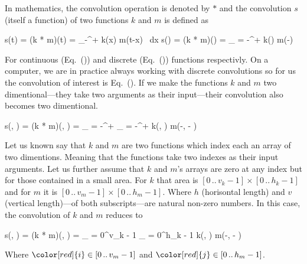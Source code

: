 \startsubsubsection[title=Where is the convolution?]
In mathematics, the convolution operation is denoted by $*$ and the convolution $s$ (itself a function) of two functions $k$ and $m$ is defined as

\startplaceformula[reference=cont-conv]
\startformula
s(t) = (k * m)(t) = \int_{{-}\infty}^{{+}\infty} k(x) \cdot m(t-x) \, {\rm d}x
\stopformula
\stopplaceformula
\startplaceformula[reference=disc-conv]
\startformula
s(\color[red]{i}) = (k * m)(\color[red]{i}) = \sum_{\color[blue]{i} = {-}\infty}^{{+}\infty} k(\color[blue]{i}) \cdot m(\color[red]{i}-\color[blue]{i})
\stopformula
\stopplaceformula

For continuous (Eq.~()) and discrete (Eq.~()) functions respectivly.
On a computer, we are in practice always working with discrete convolutions so for us the convolution of interest is Eq.~().
If we make the functions $k$ and $m$ two dimentional---they take two arguments as their input---their convolution also becomes two dimentional.

\startplaceformula[reference=twodim-disc-conv]
\startformula
s(\color[red]{i}, \color[red]{j}) = (k * m)(\color[red]{i}, \color[red]{j}) = \sum_{\color[blue]{i} = {-}\infty}^{{+}\infty} \sum_{\color[blue]{j} = {-}\infty}^{{+}\infty} k(\color[blue]{i}, \color[blue]{j}) \cdot m(\color[red]{i}-\color[blue]{i}, \color[red]{j} - \color[blue]{j})
\stopformula
\stopplaceformula

\indentation
Let us known say that $k$ and $m$ are two functions which index each an array of two dimentions.
Meaning that the functions take two indexes as their input arguments.
Let us further assume that $k$ and $m$'s arrays are zero at any index but for those contained in a small area.
For $k$ that area is $[0 \, .. \, v_k - 1] \times [0 \, .. \, h_k - 1]$ and for $m$ it is $[0 \, .. \, v_m - 1] \times [0 \, .. \, h_m - 1]$.
Where $h$ (horisontal length) and $v$ (vertical length)---of both subscripts---are natural non-zero numbers.
In this case, the convolution of $k$ and $m$ reduces to

\startplaceformula[reference=twodim-disc-conv-finite]
\startformula
s(\color[red]{i}, \color[red]{j}) = (k * m)(\color[red]{i}, \color[red]{j}) = \sum_{\color[blue]{i} = 0}^{v_k - 1} \sum_{\color[blue]{j} = 0}^{h_k - 1} k(\color[blue]{i}, \color[blue]{j}) \cdot m(\color[red]{i}-\color[blue]{i}, \color[red]{j} - \color[blue]{j})
\stopformula
\stopplaceformula

Where $\color[red]{i} \in [0 \, .. \, v_m - 1]$ and $\color[red]{j} \in [0 \, .. \, h_m - 1]$.

